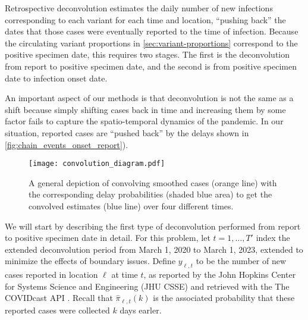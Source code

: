 Retrospective deconvolution estimates the daily number of new infections
corresponding to each variant for each time and location, ``pushing back'' the
dates that those cases were eventually reported to the time of infection.
Because the circulating variant proportions in \autoref{sec:variant-proportions}
correspond to the positive specimen date, this requires two stages. The first is
the deconvolution from report to positive specimen date, and the second is from
positive specimen date to infection onset date.

An important aspect of our methods is that deconvolution is not the same as a shift because simply shifting cases back in time and increasing them by some factor fails to capture the spatio-temporal dynamics of the pandemic. In our situation, reported cases are ``pushed back'' by the delays shown in \autoref{fig:chain_events_onset_report}).

\begin{figure}[!tb]
\centering
    \texttt{[image: convolution\_diagram.pdf]}
    \caption{A general depiction of convolving smoothed cases (orange line) with the corresponding delay probabilities (shaded blue area) to get the convolved estimates (blue line) over four different times.}
    \label{fig:convol}
\end{figure}


We will start by describing the first type of deconvolution performed from
report to positive specimen date in detail. For this problem, let $t=1,\ldots,T'$
index the extended deconvolution period from March 1, 2020 to March 1, 2023,
extended to minimize the effects of boundary issues. Define $y_{\ell,t}$
to be the number of new cases reported in location $\ell$ at time $t$, as
reported by the John Hopkins Center for Systems Science and Engineering (JHU
CSSE)\citealp{dong2020interactive} and retrieved with the The COVIDcast API
\citep{reinhart2021open}. Recall that $\widehat{\pi}_{\ell,t}(k)$ is the
associated probability that these reported cases were collected $k$ days earler. 

